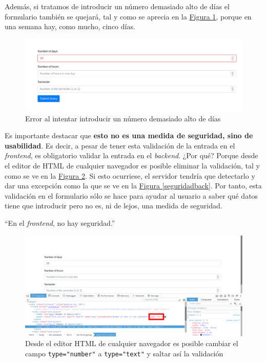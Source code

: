 \begin{enumerate}[$\bullet$]
{  Además, si tratamos de introducir un número demasiado alto de días el formulario también se quejará, tal y como se aprecia en la \hyperref[validationerrormax]{Figura \ref*{validationerrormax}}, porque en una semana hay, como mucho, cinco días. 

  \begin{figure}
    \centering
    \includegraphics[width=\textwidth]{img/validationerrormax}
    \caption{Error al intentar introducir un número demasiado alto de días}
    \label{validationerrormax}
  \end{figure}

  Es importante destacar que \textbf{esto no es una medida de seguridad, sino de usabilidad}. Es decir, a pesar de tener esta validación de la entrada en el \textit{frontend}, es obligatorio validar la entrada en el \textit{backend}. ¿Por qué? Porque desde el editor de HTML de cualquier navegador es posible eliminar la validación, tal y como se ve en la \hyperref[seguridad0]{Figura \ref*{seguridad0}}. Si esto ocurriese, el servidor tendría que detectarlo y dar una excepción como la que se ve en la \hyperref[seguridadback]{Figura \ref*{seguridadback}}. Por tanto, esta validación en el formulario sólo se hace para ayudar al usuario a saber qué datos tiene que introducir pero no es, ni de lejos, una medida de seguridad.

  \begin{displayquote}
    ``En el \textit{frontend}, no hay seguridad.''
  \end{displayquote}

  \begin{figure}
    \centering
    \includegraphics[width=\textwidth]{img/seguridad0}
    \caption{Desde el editor HTML de cualquier navegador es posible cambiar el campo \texttt{type="number"} a \texttt{type="text"} y saltar así la validación}
    \label{seguridad0}
  \end{figure}

}
\end{enumerate}
